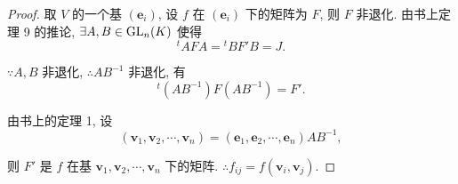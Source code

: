 \documentclass[color=black,device=normal,lang=cn,mode=geye]{elegantnote}
\begin{document}
\begin{proof}
    取 $V$ 的一个基 $(\boldsymbol{e}_i)$, 设 $f$ 在 $(\boldsymbol{e}_i)$ 下的矩阵为 $F$, 则 $F$ 非退化. 由书上定理 9 的推论, $\exists A,B\in\operatorname{GL} _n(K)$ 使得
    \[{}^tAFA={}^tBF'B=J.\]

    $\because A,B$ 非退化, $\therefore AB^{-1}$ 非退化, 有
    \[{}^t(AB^{-1})F(AB^{-1})=F'.\]

    由书上的定理 1, 设
    \[(\boldsymbol{v}_1,\boldsymbol{v}_2,\cdots,\boldsymbol{v}_n)=(\boldsymbol{e}_1,\boldsymbol{e}_2,\cdots,\boldsymbol{e}_n)AB^{-1},\]

    则 $F'$ 是 $f$ 在基 $\boldsymbol{v}_1,\boldsymbol{v}_2,\cdots,\boldsymbol{v}_n$ 下的矩阵. $\therefore f_{ij}=f(\boldsymbol{v}_i,\boldsymbol{v}_j)$.
\end{proof}
\end{document}
